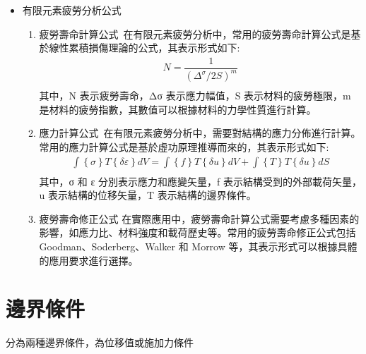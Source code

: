 \begin{itemize}
\begin{enumerate}
\end{enumerate}
\newpage


\item 有限元素疲勞分析公式

\begin{enumerate}

\item 疲勞壽命計算公式\
在有限元素疲勞分析中，常用的疲勞壽命計算公式是基於線性累積損傷理論的公式，其表示形式如下:\\
\[
\begin{aligned}
N=\dfrac{1}{\left( \Delta ^{\sigma }/2S\right) ^{m}}\\
\end{aligned}
\]
其中，N 表示疲勞壽命，Δσ 表示應力幅值，S 表示材料的疲勞極限，m 是材料的疲勞指數，其數值可以根據材料的力學性質進行計算。\\

\item 應力計算公式\
在有限元素疲勞分析中，需要對結構的應力分佈進行計算。常用的應力計算公式是基於虛功原理推導而來的，其表示形式如下:\\
\[
\begin{aligned}
\int \left\{ \sigma \right\} T\left\{ \delta \varepsilon \right\} dV=\int \left\{ f\right\} T\left\{ \delta u\right\} dV+\int \left\{ T\right\} T\left\{ \delta u\right\} dS\\
\end{aligned}
\]
其中，{σ} 和 {ε} 分別表示應力和應變矢量，{f} 表示結構受到的外部載荷矢量，{u} 表示結構的位移矢量，{T} 表示結構的邊界條件。\\

\item 疲勞壽命修正公式
在實際應用中，疲勞壽命計算公式需要考慮多種因素的影響，如應力比、材料強度和載荷歷史等。常用的疲勞壽命修正公式包括 Goodman、Soderberg、Walker 和 Morrow 等，其表示形式可以根據具體的應用要求進行選擇。
\end{enumerate}

\end{itemize}
\newpage

\section{邊界條件}
分為兩種邊界條件，為位移值或施加力條件

